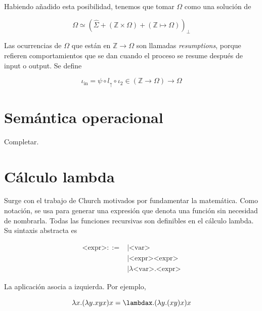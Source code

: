 \documentclass[article, 12pt]{article}
\begin{document}
Habiendo añadido esta posibilidad, tenemos que tomar $\Omega$ como una solución
de 

\begin{equation*}
  \Omega \simeq \left( \hat{\Sigma} + \left( \mathbb{Z} \times \Omega \right) +
  \left( \mathbb{Z} \mapsto \Omega \right) \right)_\bot 
\end{equation*}

Las ocurrencias de $\Omega$ que están en $\mathbb{Z} \to \Omega$ son llamadas
\textit{resumptions}, porque refieren comportamientos que se dan cuando el
proceso se resume después de input o output. Se define 

\begin{equation*}
  \iota_{\text{in}} = \psi \circ l_{\uparrow} \circ \iota_2 \in \left(
  \mathbb{Z} \to \Omega \right) \to \Omega
\end{equation*}

\newpage
\section{Semántica operacional}

Completar. 

\section{Cálculo lambda}

Surge con el trabajo de Church motivados por fundamentar la matemática. Como
notación, se usa para  generar una expresión que denota una función sin
necesidad de nombrarla. Todas las funciones recursivas son definibles en el
cálculo lambda. Su sintaxis abstracta es 

\begin{align*}
  \text{<expr>} ::= &\mid \text{<var>} \\ 
                    &\mid \text{<expr><expr>} \\ 
                    &\mid \lambda \text{<var>}.\text{<expr>}
\end{align*}

La aplicación asocia a izquierda. Por ejemplo, 

\begin{equation*}
  \lambda x . (\lambda y. xyx)x = \lambdax.(\lambda y.(xy)x)x
\end{equation*}
\end{document}
